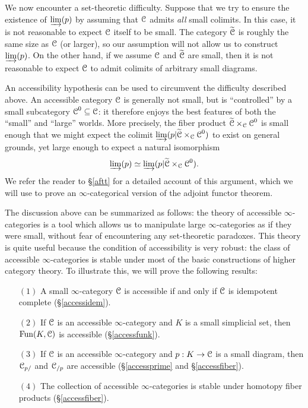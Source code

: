 We now encounter a set-theoretic difficulty. Suppose that we try to ensure the existence of $\varinjlim(p)$ by assuming that $\operatorname{\mathcal{C}}$ admits {\em all} small colimits. In this case, it is not reasonable to expect $\operatorname{\mathcal{C}}$ itself to be small. The category $\widetilde{\operatorname{\mathcal{C}}}$ is roughly the same size as $\operatorname{\mathcal{C}}$ (or larger), so our assumption will not allow us to construct $\varinjlim(p)$. On
the other hand, if we assume $\operatorname{\mathcal{C}}$ and $\widetilde{\operatorname{\mathcal{C}}}$ are small, then it is not reasonable
to expect $\operatorname{\mathcal{C}}$ to admit colimits of arbitrary small diagrams.

An accessibility hypothesis can be used to circumvent the difficulty described above. 
An accessible category $\operatorname{\mathcal{C}}$ is generally not small, but is ``controlled'' by a small subcategory $\operatorname{\mathcal{C}}^{0} \subseteq \operatorname{\mathcal{C}}$: it therefore enjoys the best features of both the ``small'' and ``large'' worlds. More precisely, the fiber product $\widetilde{\operatorname{\mathcal{C}}} \times_{\operatorname{\mathcal{C}}} \operatorname{\mathcal{C}}^{0}$ is small enough that we might expect the colimit $\varinjlim(p | \widetilde{\operatorname{\mathcal{C}}} \times_{\operatorname{\mathcal{C}}} \operatorname{\mathcal{C}}^{0})$ to exist on general grounds, yet large enough to expect a natural isomorphism
$$ \varinjlim(p) \simeq \varinjlim( p | \widetilde{\operatorname{\mathcal{C}}} \times_{\operatorname{\mathcal{C}}} \operatorname{\mathcal{C}}^{0}).$$
We refer the reader to \S \ref{aftt} for a detailed account of this argument, which we will use to prove an $\infty$-categorical version of the adjoint functor theorem.

The discussion above can be summarized as follows: the theory of accessible $\infty$-categories is a tool which allows us to manipulate large $\infty$-categories as if they were small, without fear of encountering any set-theoretic paradoxes. This theory is quite useful because the condition of accessibility is very robust: the class of accessible $\infty$-categories is stable under most of the basic constructions of higher category theory. To illustrate this, we will prove the following results:

\begin{itemize}
\item[$(1)$] A small $\infty$-category $\operatorname{\mathcal{C}}$ is accessible if and only if $\operatorname{\mathcal{C}}$ is idempotent complete (\S \ref{accessidem}). 
\item[$(2)$] If $\operatorname{\mathcal{C}}$ is an accessible $\infty$-category and $K$ is a small simplicial set, then
$\operatorname{Fun}(K,\operatorname{\mathcal{C}})$ is accessible (\S \ref{accessfunk}).
\item[$(3)$] If $\operatorname{\mathcal{C}}$ is an accessible $\infty$-category and $p:K \rightarrow \operatorname{\mathcal{C}}$ is a small diagram, then $\operatorname{\mathcal{C}}_{p/}$ and $\operatorname{\mathcal{C}}_{/p}$ are accessible (\S \ref{accessprime} and \S \ref{accessfiber}). 
\item[$(4)$] The collection of accessible $\infty$-categories is stable under homotopy fiber products (\S \ref{accessfiber}).
\end{itemize}

